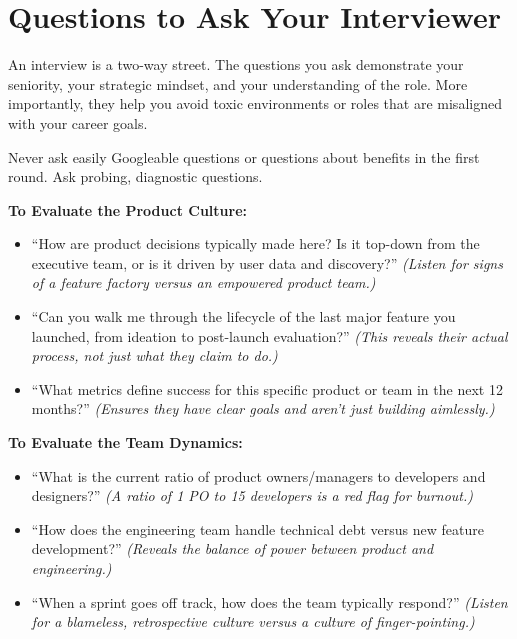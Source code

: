 \bigskip

\section{Questions to Ask Your
Interviewer}\label{questions-to-ask-your-interviewer}

An interview is a two-way street. The questions you ask demonstrate your
seniority, your strategic mindset, and your understanding of the role.
More importantly, they help you avoid toxic environments or roles that
are misaligned with your career goals.

Never ask easily Googleable questions or questions about benefits in the
first round. Ask probing, diagnostic questions.

\textbf{To Evaluate the Product Culture:}

\begin{itemize}
\tightlist
\item
  ``How are product decisions typically made here? Is it top-down from
  the executive team, or is it driven by user data and discovery?''
  \emph{(Listen for signs of a feature factory versus an empowered
  product team.)}
\item
  ``Can you walk me through the lifecycle of the last major feature you
  launched, from ideation to post-launch evaluation?'' \emph{(This
  reveals their actual process, not just what they claim to do.)}
\item
  ``What metrics define success for this specific product or team in the
  next 12 months?'' \emph{(Ensures they have clear goals and aren't just
  building aimlessly.)}
\end{itemize}

\textbf{To Evaluate the Team Dynamics:}

\begin{itemize}
\tightlist
\item
  ``What is the current ratio of product owners/managers to developers
  and designers?'' \emph{(A ratio of 1 PO to 15 developers is a red flag
  for burnout.)}
\item
  ``How does the engineering team handle technical debt versus new
  feature development?'' \emph{(Reveals the balance of power between
  product and engineering.)}
\item
  ``When a sprint goes off track, how does the team typically respond?''
  \emph{(Listen for a blameless, retrospective culture versus a culture
  of finger-pointing.)}
\end{itemize}


